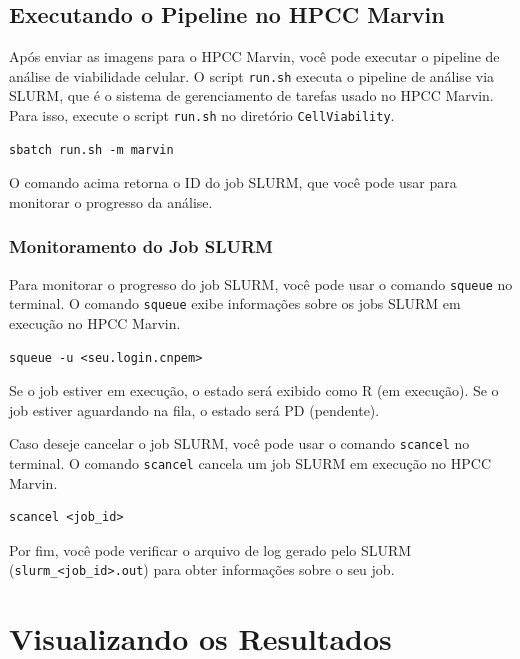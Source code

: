 \documentclass{article}
\begin{document}
\subsection{Executando o Pipeline no HPCC Marvin}

Após enviar as imagens para o HPCC Marvin, você pode executar o pipeline de análise de viabilidade celular. O script \texttt{run.sh} executa o pipeline de análise via SLURM, que é o sistema de gerenciamento de tarefas usado no HPCC Marvin. Para isso, execute o script \texttt{run.sh} no diretório \texttt{CellViability}.

\begin{verbatim}
sbatch run.sh -m marvin
\end{verbatim}

O comando acima retorna o ID do job SLURM, que você pode usar para monitorar o progresso da análise.

\subsubsection{Monitoramento do Job SLURM}

Para monitorar o progresso do job SLURM, você pode usar o comando \texttt{squeue} no terminal. O comando \texttt{squeue} exibe informações sobre os jobs SLURM em execução no HPCC Marvin.

\begin{verbatim}
squeue -u <seu.login.cnpem>
\end{verbatim}

Se o job estiver em execução, o estado será exibido como R (em execução). Se o job estiver aguardando na fila, o estado será PD (pendente).

Caso deseje cancelar o job SLURM, você pode usar o comando \texttt{scancel} no terminal. O comando \texttt{scancel} cancela um job SLURM em execução no HPCC Marvin.

\begin{verbatim}
scancel <job_id>
\end{verbatim}

Por fim, você pode verificar o arquivo de log gerado pelo SLURM (\texttt{slurm\_<job\_id>.out}) para obter informações sobre o seu job.

\section{Visualizando os Resultados}
\end{document}
